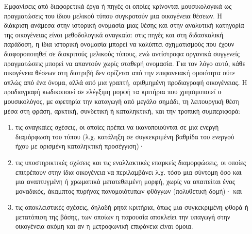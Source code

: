 \documentclass[11pt,a4paper]{article}
\begin{document}
Εμφανίσεις από διαφορετικά έργα ή πηγές οι οποίες κρίνονται μουσικολογικά ως πραγματώσεις του ίδιου μελικού τύπου συγκροτούν μια οικογένεια θέσεων. Η διάκριση ανάμεσα στην ιστορική ονομασία μιας θέσης και στην αναλυτική κατηγορία της οικογένειας είναι μεθοδολογικά αναγκαία: στις πηγές και στη διδασκαλική παράδοση, η ίδια ιστορική ονομασία μπορεί να καλύπτει σχηματισμούς που έχουν διαφοροποιηθεί σε διακριτούς μελικούς τύπους, ενώ αντίστροφα οργανικά συγγενείς πραγματώσεις μπορεί να απαντούν χωρίς σταθερή ονομασία. Για τον λόγο αυτό, κάθε οικογένεια θέσεων στη διατριβή δεν ορίζεται από την επιφανειακή ομοιότητα ούτε απλώς από ένα όνομα, αλλά από μια γραπτή, αριθμημένη προδιαγραφή οικογένειας. Η προδιαγραφή κωδικοποιεί σε ελέγξιμη μορφή τα κριτήρια που χρησιμοποιεί ο μουσικολόγος, με αφετηρία την καταγωγή από μεγάλο σημάδι, τη λειτουργική θέση μέσα στη φράση, αρκτική, συνδετική ή καταληκτική, και την τροπική συμπεριφορά:
\begin{enumerate}
\item τις αναγκαίες σχέσεις, οι οποίες πρέπει να ικανοποιούνται σε μια ενεργή διαμόρφωση του τύπου (λ.χ. κατάληξη σε συγκεκριμένη βαθμίδα του ενεργού ήχου με ορισμένη καταληκτική προσέγγιση)·
\item τις υποστηρικτικές σχέσεις και τις εναλλακτικές επαρκείς διαμορφώσεις, οι οποίες επιτρέπουν στην ίδια οικογένεια να περιλαμβάνει λ.χ. τόσο μια σύντομη όσο και μια αναπτυγμένη ή χρωματικά μετατεθειμένη μορφή, χωρίς να απαιτείται ένας μοναδικός, άκαμπτος πυρήνας πανομοιότυπων φθόγγων (πολυθετική δομή)· και
\item τις αποκλειστικές σχέσεις, δηλαδή ρητά κριτήρια, όπως μια συγκεκριμένη φθορά ή μετατόπιση της βάσης, των οποίων η παρουσία αποκλείει την υπαγωγή στην οικογένεια ακόμη και αν η μετροφωνική επιφάνεια είναι όμοια.
\end{enumerate}
\end{document}
